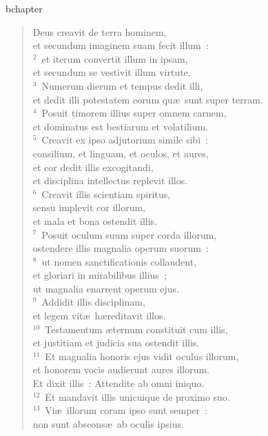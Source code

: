 bchapter\begin{verse}\vspace{-19pt}Deus creavit de terra hominem,\\ et secundum imaginem suam fecit illum~:\\
${}^{2}$~et iterum convertit illum in ipsam,\\ et secundum se vestivit illum virtute.\\
${}^{3}$~Numerum dierum et tempus dedit illi,\\ et dedit illi potestatem eorum qu\ae\ sunt super terram.\\
${}^{4}$~Posuit timorem illius super omnem carnem,\\ et dominatus est bestiarum et volatilium.\\
${}^{5}$~Creavit ex ipso adjutorium simile sibi~:\\ consilium, et linguam, et oculos, et aures,\\ et cor dedit illis excogitandi,\\ et disciplina intellectus replevit illos.\\
${}^{6}$~Creavit illis scientiam spiritus,\\ sensu implevit cor illorum,\\ et mala et bona ostendit illis.\\
${}^{7}$~Posuit oculum suum super corda illorum,\\ ostendere illis magnalia operum suorum~:\\
${}^{8}$~ut nomen sanctificationis collaudent,\\ et gloriari in mirabilibus illius~;\\ ut magnalia enarrent operum ejus.\\
${}^{9}$~Addidit illis disciplinam,\\ et legem vit\ae\ h\ae reditavit illos.\\
${}^{10}$~Testamentum \ae ternum constituit cum illis,\\ et justitiam et judicia sua ostendit illis.\\
${}^{11}$~Et magnalia honoris ejus vidit oculus illorum,\\ et honorem vocis audierunt aures illorum.\\ Et dixit illis~: Attendite ab omni iniquo.\\
${}^{12}$~Et mandavit illis unicuique de proximo suo.\\
${}^{13}$~Vi\ae\ illorum coram ipso sunt semper~:\\ non sunt abscons\ae\ ab oculis ipsius.\\

\end{verse}
